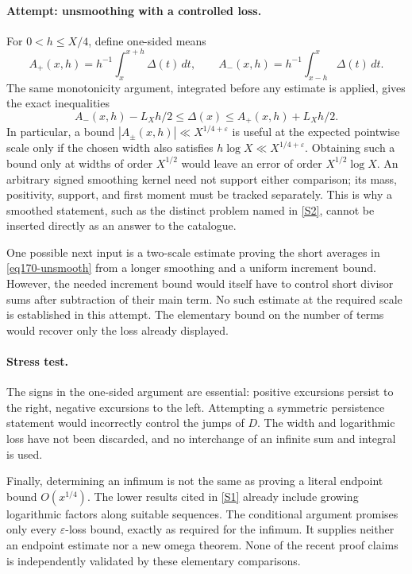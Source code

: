 \documentclass[11pt,a4paper]{article}
\newcommand{\eps}{\varepsilon}
\newcommand{\sref}[2]{\hyperlink{source:#1:#2}{[S#2]}}
\numberwithin{equation}{section}
\begin{document}
\paragraph{Attempt: unsmoothing with a controlled loss.}
For $0<h\le X/4$, define one-sided means
\[
 A_+(x,h)=h^{-1}\int_x^{x+h}\Delta(t)\,dt,\qquad
 A_-(x,h)=h^{-1}\int_{x-h}^{x}\Delta(t)\,dt.
\]
The same monotonicity argument, integrated before any estimate is applied,
gives the exact inequalities
\begin{equation}\label{eq170-unsmooth}
 A_-(x,h)-L_Xh/2\le\Delta(x)
                    \le A_+(x,h)+L_Xh/2.
\end{equation}
In particular, a bound $|A_\pm(x,h)|\ll X^{1/4+\eps}$ is useful at the
expected pointwise scale only if the chosen width also satisfies
$h\log X\ll X^{1/4+\eps}$. Obtaining such a bound only at widths of
order $X^{1/2}$ would leave an error of order $X^{1/2}\log X$.
An arbitrary signed smoothing kernel need not support either comparison;
its mass, positivity, support, and first moment must be tracked separately.
This is why a smoothed statement, such as the distinct problem named in
\sref{1278}{2}, cannot be inserted directly as an answer to the catalogue.

One possible next input is a two-scale estimate proving the short averages
in \eqref{eq170-unsmooth} from a longer smoothing and a uniform increment
bound. However, the needed increment bound would itself have to control
short divisor sums after subtraction of their main term. No such estimate
at the required scale is established in this attempt. The elementary bound
on the number of terms would recover only the loss already displayed.

\paragraph{Stress test.}
The signs in the one-sided argument are essential: positive excursions
persist to the right, negative excursions to the left. Attempting a
symmetric persistence statement would incorrectly control the jumps of
$D$. The width and logarithmic loss have not been discarded, and no
interchange of an infinite sum and integral is used.

Finally, determining an infimum is not the same as proving a literal
endpoint bound $O(x^{1/4})$. The lower results cited in \sref{1278}{1}
already include growing logarithmic factors along suitable sequences. The
conditional argument promises only every $\eps$-loss bound, exactly as
required for the infimum. It supplies neither an endpoint estimate nor a
new omega theorem. None of the recent proof claims is independently
validated by these elementary comparisons.
\end{document}
